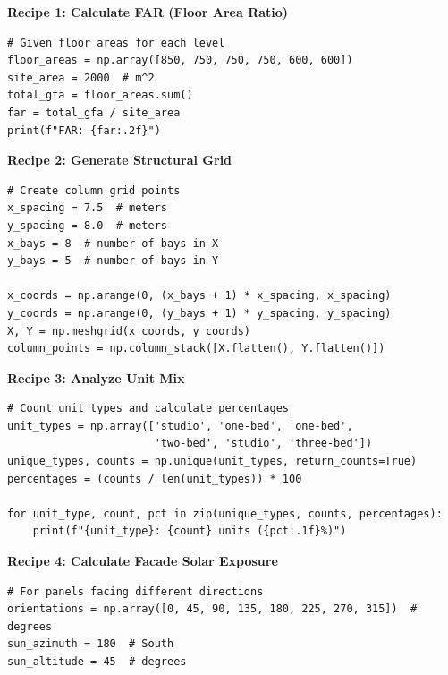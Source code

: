 

\begin{tcolorbox}[
    title=Copy-Paste Recipes,
    colframe=gray,
    colback = white,
    arc=2mm
]
\textbf{Recipe 1: Calculate FAR (Floor Area Ratio)}
\begin{lstlisting}[basicstyle=\ttfamily\footnotesize,breaklines=true,columns=fullflexible,keepspaces=true,xleftmargin=0pt]
# Given floor areas for each level
floor_areas = np.array([850, 750, 750, 750, 600, 600])
site_area = 2000  # m^2
total_gfa = floor_areas.sum()
far = total_gfa / site_area
print(f"FAR: {far:.2f}")

\end{lstlisting}

\textbf{Recipe 2: Generate Structural Grid}
\begin{lstlisting}[basicstyle=\ttfamily\footnotesize,breaklines=true,columns=fullflexible,keepspaces=true,xleftmargin=0pt]
# Create column grid points
x_spacing = 7.5  # meters
y_spacing = 8.0  # meters
x_bays = 8  # number of bays in X
y_bays = 5  # number of bays in Y

x_coords = np.arange(0, (x_bays + 1) * x_spacing, x_spacing)
y_coords = np.arange(0, (y_bays + 1) * y_spacing, y_spacing)
X, Y = np.meshgrid(x_coords, y_coords)
column_points = np.column_stack([X.flatten(), Y.flatten()])

\end{lstlisting}

\textbf{Recipe 3: Analyze Unit Mix}
\begin{lstlisting}[basicstyle=\ttfamily\footnotesize,breaklines=true,columns=fullflexible,keepspaces=true,xleftmargin=0pt]
# Count unit types and calculate percentages
unit_types = np.array(['studio', 'one-bed', 'one-bed', 
                       'two-bed', 'studio', 'three-bed'])
unique_types, counts = np.unique(unit_types, return_counts=True)
percentages = (counts / len(unit_types)) * 100

for unit_type, count, pct in zip(unique_types, counts, percentages):
    print(f"{unit_type}: {count} units ({pct:.1f}%)")

\end{lstlisting}

\textbf{Recipe 4: Calculate Facade Solar Exposure}
\begin{lstlisting}[basicstyle=\ttfamily\footnotesize,breaklines=true,columns=fullflexible,keepspaces=true,xleftmargin=0pt]
# For panels facing different directions
orientations = np.array([0, 45, 90, 135, 180, 225, 270, 315])  # degrees
sun_azimuth = 180  # South
sun_altitude = 45  # degrees


\end{lstlisting}
\end{tcolorbox}
